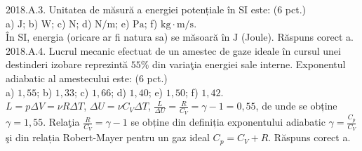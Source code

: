 2018.A.3. Unitatea de măsură a energiei potențiale în SI este: (6 pct.)\\ a) $\mathrm{J}$; b) $\mathrm{W}$; c) $\mathrm{N}$; d) $\mathrm{N} / \mathrm{m}$; e) $\mathrm{Pa}$; f) $\mathrm{kg} \cdot \mathrm{m} / \mathrm{s}$.\\ În SI, energia (oricare ar fi natura sa) se măsoară în $\mathrm{J}$ (Joule). Răspuns corect a.\\

2018.A.4. Lucrul mecanic efectuat de un amestec de gaze ideale în cursul unei destinderi izobare reprezintă $55 \%$ din variaţia energiei sale interne. Exponentul adiabatic al amestecului este: (6 pct.)\\ a) $1,55$; b) $1,33$; c) $1,66$; d) $1,40$; e) $1,50$; f) $1,42$.\\ $L=p \Delta V=\nu R \Delta T$, $\Delta U=\nu C_{V} \Delta T$, $\frac{L}{\Delta U}=\frac{R}{C_{V}}=\gamma-1=0,55$, de unde se obține $\gamma=1,55$. Relaţia $\frac{R}{C_{V}}=\gamma-1$ se obține din definiția exponentului adiabatic $\gamma=\frac{C_{p}}{C_{V}}$ şi din relația Robert-Mayer pentru un gaz ideal $C_{p}=C_{V}+R$. Răspuns corect a.\\ 


